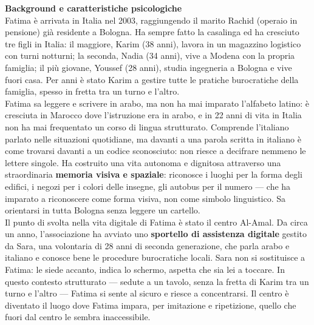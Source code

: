 ﻿\documentclass[11pt,a4paper]{article}
\begin{document}
\begin{center}


\begin{tcolorbox}[base]
    \textbf{Background e caratteristiche psicologiche} \\[4pt]
    {\small
    Fatima è arrivata in Italia nel 2003, raggiungendo il marito
    Rachid (operaio in pensione) già residente a Bologna.
    Ha sempre fatto la casalinga ed ha cresciuto tre figli
    in Italia: il maggiore, Karim (38 anni), lavora in un
    magazzino logistico con turni notturni; la seconda,
    Nadia (34 anni), vive a Modena con la propria famiglia;
    il più giovane, Youssef (28 anni), studia ingegneria
    a Bologna e vive fuori casa. Per anni è stato Karim
    a gestire tutte le pratiche burocratiche della famiglia,
    spesso in fretta tra un turno e l'altro. \\[4pt]

    Fatima sa leggere e scrivere in arabo, ma non ha mai
    imparato l'alfabeto latino: è cresciuta in Marocco dove
    l'istruzione era in arabo, e in 22 anni di vita in Italia
    non ha mai frequentato un corso di lingua strutturato.
    Comprende l'italiano parlato nelle situazioni quotidiane,
    ma davanti a una parola scritta in italiano è come
    trovarsi davanti a un codice sconosciuto:
    non riesce a decifrare nemmeno le lettere singole.
    Ha costruito una vita autonoma e dignitosa attraverso
    una straordinaria \textbf{memoria visiva e spaziale}:
    riconosce i luoghi per la forma degli edifici, i negozi
    per i colori delle insegne, gli autobus per il numero ---
    che ha imparato a riconoscere come forma visiva,
    non come simbolo linguistico.
    Sa orientarsi in tutta Bologna senza leggere un cartello. \\[4pt]

    Il punto di svolta nella vita digitale di Fatima
    è stato il centro Al-Amal. Da circa un anno,
    l'associazione ha avviato uno \textbf{sportello
    di assistenza digitale} gestito da Sara, una
    volontaria di 28 anni di seconda generazione,
    che parla arabo e italiano e conosce bene
    le procedure burocratiche locali. Sara non si
    sostituisce a Fatima: le siede accanto, indica
    lo schermo, aspetta che sia lei a toccare.
    In questo contesto strutturato --- sedute a un
    tavolo, senza la fretta di Karim tra un turno
    e l'altro --- Fatima si sente al sicuro e riesce
    a concentrarsi. Il centro è diventato il luogo
    dove Fatima impara, per imitazione e ripetizione,
    quello che fuori dal centro le sembra inaccessibile. \\[4pt]

}
\end{tcolorbox}
\end{center}
\end{document}

